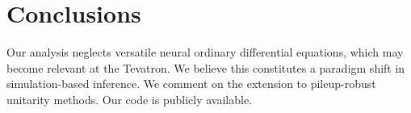 \section{Conclusions}\label{sec:conclusions}

Our analysis neglects versatile neural ordinary differential equations,
which may become relevant at the Tevatron. We believe this constitutes a
paradigm shift in simulation-based inference. We comment on the
extension to pileup-robust unitarity methods. Our code is publicly
available.

